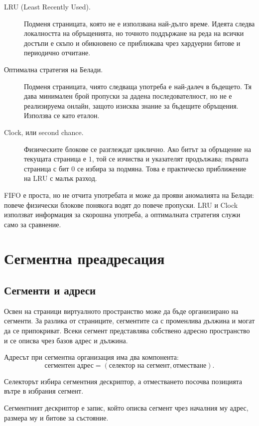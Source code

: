 \begin{description}
\item[LRU (Least Recently Used).] Подменя страницата, която не е използвана най-дълго време. Идеята следва локалността на обръщенията, но точното поддържане на реда на всички достъпи е скъпо и обикновено се приближава чрез хардуерни битове и периодично отчитане.
\item[Оптимална стратегия на Белади.] Подменя страницата, чиято следваща употреба е най-далеч в бъдещето. Тя дава минимален брой пропуски за дадена последователност, но не е реализируема онлайн, защото изисква знание за бъдещите обръщения. Използва се като еталон.
\item[Clock, или second chance.] Физическите блокове се разглеждат циклично. Ако битът за обръщение на текущата страница е $1$, той се изчиства и указателят продължава; първата страница с бит $0$ се избира за подмяна. Това е практическо приближение на LRU с малък разход.
\end{description}

FIFO е проста, но не отчита употребата и може да прояви аномалията на Белади: повече физически блокове понякога водят до повече пропуски. LRU и Clock използват информация за скорошна употреба, а оптималната стратегия служи само за сравнение.

\section{Сегментна преадресация}\label{s:10.3}

\subsection{Сегменти и адреси}\label{s:10.3.1}

\begin{defn}[Сегмент]
Освен на страници виртуалното пространство може да бъде организирано на сегменти. За разлика от страниците, сегментите са с променлива дължина и могат да се припокриват. Всеки сегмент представлява собствено адресно пространство и се описва чрез базов адрес и дължина.
\end{defn}

Адресът при сегментна организация има два компонента:
\[
\text{сегментен адрес}=(\text{селектор на сегмент},\text{отместване}).
\]

Селекторът избира сегментния дескриптор, а отместването посочва позицията вътре в избрания сегмент.

\begin{defn}
Сегментният дескриптор е запис, който описва сегмент чрез началния му адрес, размера му и битове за състояние.
\end{defn}

